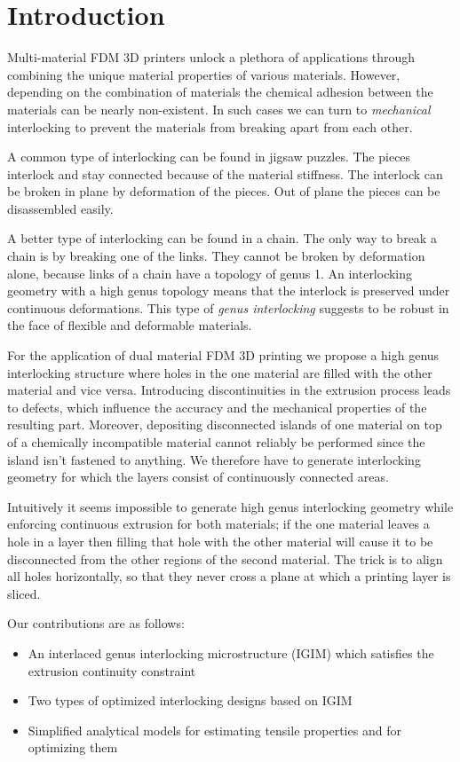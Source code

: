 \section{Introduction}
Multi-material FDM 3D printers unlock a plethora of applications through combining the unique material properties of various materials.
However, depending on the combination of materials the chemical adhesion between the materials can be nearly non-existent.
In such cases we can turn to \emph{mechanical} interlocking to prevent the materials from breaking apart from each other.

A common type of interlocking can be found in jigsaw puzzles.
The pieces interlock and stay connected because of the material stiffness.
The interlock can be broken in plane by deformation of the pieces.
Out of plane the pieces can be disassembled easily.

A better type of interlocking can be found in a chain.
The only way to break a chain is by breaking one of the links.
They cannot be broken by deformation alone, because links of a chain have a topology of genus 1.
An interlocking geometry with a high genus topology means that the interlock is preserved under continuous deformations.
This type of \emph{genus interlocking} suggests to be robust in the face of flexible and deformable materials.

For the application of dual material FDM 3D printing we propose a high genus interlocking structure where holes in the one material are filled with the other material and vice versa.
Introducing discontinuities in the extrusion process leads to defects, which influence the accuracy and the mechanical properties of the resulting part.
Moreover, depositing disconnected islands of one material on top of a chemically incompatible material cannot reliably be performed since the island isn't fastened to anything.
We therefore have to generate interlocking geometry for which the layers consist of continuously connected areas.

Intuitively it seems impossible to generate high genus interlocking geometry while enforcing continuous extrusion for both materials;
if the one material leaves a hole in a layer then filling that hole with the other material will cause it to be disconnected from the other regions of the second material.
The trick is to align all holes horizontally, so that they never cross a plane at which a printing layer is sliced.



Our contributions are as follows:
\begin{itemize}
	\item An interlaced genus interlocking microstructure (IGIM) which satisfies the extrusion continuity constraint
	\item Two types of optimized interlocking designs based on IGIM
	\item Simplified analytical models for estimating tensile properties and for optimizing them
\end{itemize}










